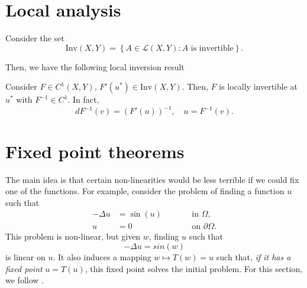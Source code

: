 \section{Local analysis}
Consider the set 
\[ \text{Inv}(X,Y) = \left\{ A\in \mathcal{L}(X,Y): A \text{ is invertible} \right\}. \]

Then, we have the following local inversion result

\begin{theorem}
    Consider $F\in C^1(X,Y)$, $F'(u^*)\in\text{Inv}(X,Y)$. Then, $F$ is locally invertible at $u^*$ with $F^{-1}\in C^1$. In fact,
    \[ dF^{-1}(v) = (F'(u))^{-1}, \quad u=F^{-1}(v). \]
\end{theorem}


\section{Fixed point theorems}
The main idea is that certain non-linearities would be less terrible if we could fix one of the functions. For example, consider the problem of finding a function $u$ such that
\begin{equation}
\begin{aligned}
    -\Delta u &= \sin (u) &&\qquad \text{in $\Omega$},  \\
    u &= 0 && \qquad \text{on $\partial\Omega$}.
\end{aligned}
\end{equation}
This problem is non-linear, but given $w$, finding $u$ such that
\begin{equation}\label{eq:fixed-point:lap u sin u}
     -\Delta u = sin(w)
\end{equation}
is linear on $u$. It also induces a mapping $w \mapsto T(w) = u$ such that, \emph{if it has a fixed point} $u=T(u)$, this fixed point solves the initial problem. For this section, we follow \cite{ciarlet2013linear,pata2019fixed}.


